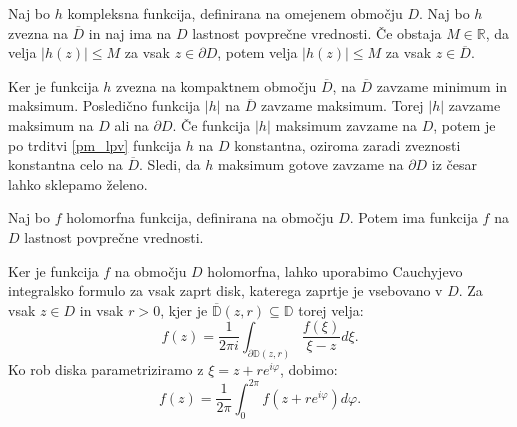 \documentclass[mat1]{fmfdelo}
\begin{document}
    \begin{posledica}
        \label{posledica_pm_lpv}
        Naj bo $h$  kompleksna funkcija, definirana na omejenem območju $D$. Naj bo $h$ zvezna na $\overline{D}$ in naj ima na $D$ lastnost povprečne vrednosti. 
        Če obstaja $M \in \mathbb{R}$, da velja $|h(z)| \leq M$ za vsak $z \in \partial D$, potem velja $|h(z)| \leq M$ za vsak $z \in \overline{D}$. 
    \end{posledica}
    \begin{dokaz}
        Ker je funkcija $h$ zvezna na kompaktnem območju $\overline{D}$, na $\overline{D}$ zavzame minimum in maksimum. Posledično funkcija $|h|$ na $\overline{D}$ zavzame maksimum. 
        Torej $|h|$ zavzame maksimum na $D$ ali na $\partial D$. Če funkcija $|h|$ maksimum zavzame na $D$, potem je po trditvi \ref{pm_lpv} funkcija $h$ na $D$ konstantna, oziroma zaradi zveznosti konstantna celo na $\overline{D}$. 
        Sledi, da $h$ maksimum gotove zavzame na $\partial D$ iz česar lahko sklepamo želeno.
    \end{dokaz}

    \begin{trditev}
        Naj bo $f$ holomorfna funkcija, definirana na območju $D$. Potem ima funkcija $f$ na $D$ lastnost povprečne vrednosti.
    \end{trditev}
    \begin{dokaz}
        Ker je funkcija $f$ na območju $D$ holomorfna, lahko uporabimo Cauchyjevo integralsko formulo za vsak zaprt disk, katerega zaprtje je vsebovano v $D$. Za vsak $z \in D$ in vsak $r > 0$, kjer je $\overline{\mathbb{D}}(z,r) \subseteq \mathbb{D}$ torej velja:
        $$
        f(z) = \frac{1}{2 \pi i} \int_{\partial \mathbb{D}(z, r)}{\frac{f(\xi)}{\xi  - z}}d\xi.
        $$
        Ko rob diska parametriziramo z $\xi = z + r e^{i \varphi}$, dobimo:
        $$
        f(z) = \frac{1}{2 \pi} \int_{0}^{2\pi}{f(z + re^{i\varphi})}d\varphi.
        $$
    \end{dokaz}
\end{document}
